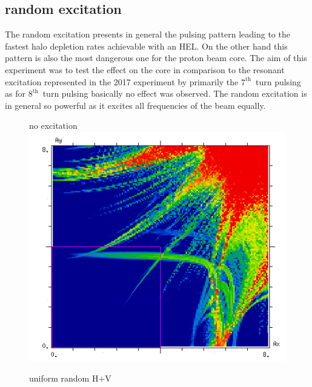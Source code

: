 \documentclass[%
 reprint,
 amsmath,amssymb,
 aps,
prstab,
longbibliography,
]{revtex4-1}
\begin{document}
\subsection{random excitation\label{sec:simexran}}
The random excitation presents in general the pulsing pattern leading to the fastest halo depletion rates achievable with an HEL. On the other hand this pattern is also the most dangerous one for the proton beam core. The aim of this experiment was to test the effect on the core in comparison to the resonant excitation represented in the 2017 experiment by primarily the $7^{\mathrm{th}}$~turn pulsing as for $8^{\mathrm{th}}$~turn pulsing basically no effect was observed. The random excitation is in general so powerful as it excites all frequencies of the beam equally.
\begin{figure}[h]
	\begin{minipage}[t]{0.49\linewidth}
		\centering
		no excitation
		\includegraphics[width=1.0\linewidth]{2017injnocolc15o+19_6noerru_dp0_amp.png}
	\end{minipage}
	\begin{minipage}[t]{0.49\linewidth}
		\centering
		uniform random H+V

\end{minipage}
\end{figure}
\end{document}
